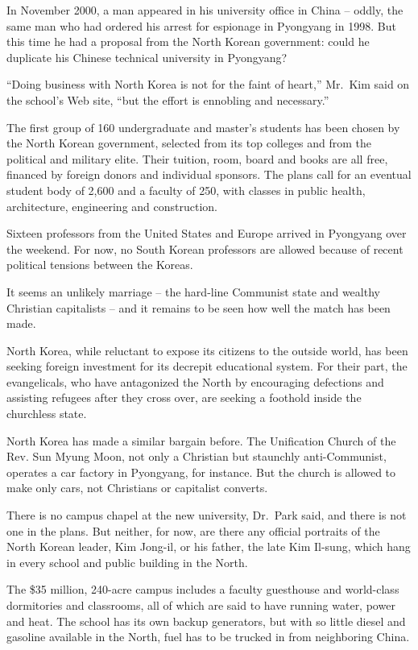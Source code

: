 ﻿\documentclass[12pt]{article}
\begin{document}
In November 2000, a man appeared in his university office in China -- oddly, the same man who had
ordered his arrest for espionage in Pyongyang in 1998. But this time he had a proposal from the
North Korean government: could he duplicate his Chinese technical university in Pyongyang?

``Doing business with North Korea is not for the faint of heart,'' Mr.~Kim said on the school's Web
site, ``but the effort is ennobling and necessary.''

The first group of 160 undergraduate and master's students has been chosen by the North Korean
government, selected from its top colleges and from the political and military elite. Their tuition,
room, board and books are all free, financed by foreign donors and individual sponsors. The plans
call for an eventual student body of 2,600 and a faculty of 250, with classes in public health,
architecture, engineering and construction.

Sixteen professors from the United States and Europe arrived in Pyongyang over the weekend. For now,
no South Korean professors are allowed because of recent political tensions between the Koreas.

It seems an unlikely marriage -- the hard-line Communist state and wealthy Christian capitalists --
and it remains to be seen how well the match has been made.

North Korea, while reluctant to expose its citizens to the outside world, has been seeking foreign
investment for its decrepit educational system. For their part, the evangelicals, who have
antagonized the North by encouraging defections and assisting refugees after they cross over, are
seeking a foothold inside the churchless state.

North Korea has made a similar bargain before. The Unification Church of the Rev. Sun Myung Moon,
not only a Christian but staunchly anti-Communist, operates a car factory in Pyongyang, for
instance. But the church is allowed to make only cars, not Christians or capitalist converts.

There is no campus chapel at the new university, Dr.~Park said, and there is not one in the plans.
But neither, for now, are there any official portraits of the North Korean leader, Kim Jong-il, or
his father, the late Kim Il-sung, which hang in every school and public building in the North.

The \$35 million, 240-acre campus includes a faculty guesthouse and world-class dormitories and
classrooms, all of which are said to have running water, power and heat. The school has its own
backup generators, but with so little diesel and gasoline available in the North, fuel has to be
trucked in from neighboring China.
\end{document}
